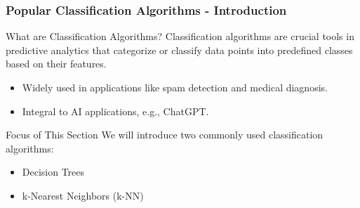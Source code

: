 \documentclass[aspectratio=169]{beamer}
\begin{document}
\begin{frame}[fragile]
    \frametitle{Popular Classification Algorithms - Introduction}
    \begin{block}{What are Classification Algorithms?}
        Classification algorithms are crucial tools in predictive analytics that categorize or classify data points into predefined classes based on their features. 
    \end{block}
    
    \begin{itemize}
        \item Widely used in applications like spam detection and medical diagnosis.
        \item Integral to AI applications, e.g., ChatGPT.
    \end{itemize}

    \begin{block}{Focus of This Section}
        We will introduce two commonly used classification algorithms: 
        \begin{itemize}
            \item Decision Trees
            \item k-Nearest Neighbors (k-NN)
        \end{itemize}
    \end{block}
\end{frame}
\end{document}
